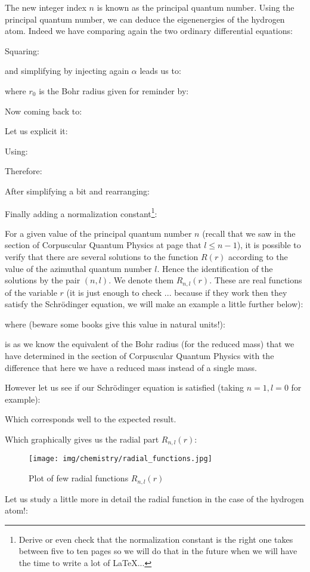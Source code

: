 	The new integer index $n$ is known as the principal quantum number. Using the principal quantum number, we can deduce the eigenenergies of the hydrogen atom. Indeed we have comparing again the two ordinary differential equations:
	
	Squaring:
	
	and simplifying by injecting again $\alpha$ leads us to:
	
	where $r_0$ is the Bohr radius given for reminder by:
	
	Now coming back to:
	
	Let us explicit it:
	
	Using:
	
	Therefore:
	
	After simplifying a bit and rearranging:
	
	Finally adding a normalization constant\footnote{Derive or even check that the normalization constant is the right one takes between five to ten pages so we will do that in the future when we will have the time to write a lot of \LaTeX ...}:
	
	
	For a given value of the principal quantum number $n$ (recall that we saw in the section of Corpuscular Quantum Physics at page \pageref{quantum number of orbital angular momentum} that $l\leq n-1$), it is possible to verify that there are several solutions to the function $R(r)$ according to the value of the azimuthal quantum number $l$. Hence the identification of the solutions by the pair $(n, l)$. We denote them $R_{n,l}(r)$. These are real functions of the variable $r$ (it is just enough to check ... because if they work then they satisfy the Schrödinger equation, we will make an example a little further below)\label{atomic orbitals of hydrogen atom}:
	
	where (beware some books give this value in natural units!):
	
	is as we know the equivalent of the Bohr radius (for the reduced mass) that we have determined in the section of Corpuscular Quantum Physics  with the difference that here we have a reduced mass instead of a single mass.
	
	However let us see if our Schrödinger equation is satisfied (taking $n=1,l=0$ for example):
	
	Which corresponds well to the expected result.

	Which graphically gives us the radial part $R_{n,l}(r)$:
	\begin{figure}[H]
		\centering
		\texttt{[image: img/chemistry/radial\_functions.jpg]}	
		\caption{Plot of few radial functions $R_{n,l}(r)$}
	\end{figure}
	Let us study a little more in detail the radial function in the case of the hydrogen atom!:


